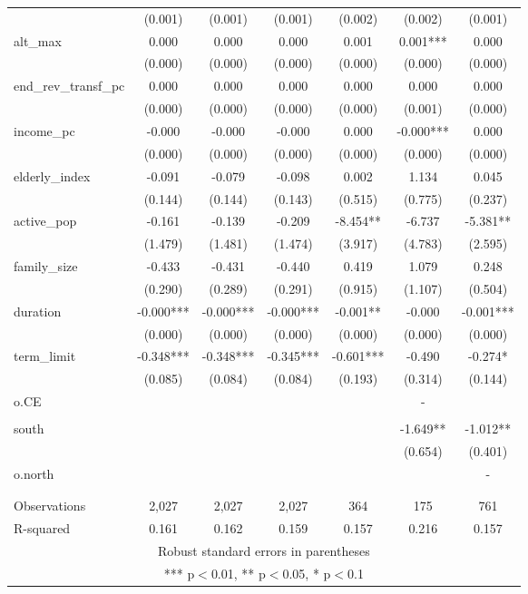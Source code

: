 \documentclass[]{article}
\begin{document}
\begin{tabular}{lcccccc}
 & (0.001) & (0.001) & (0.001) & (0.002) & (0.002) & (0.001) \\
alt\_max & 0.000 & 0.000 & 0.000 & 0.001 & 0.001*** & 0.000 \\
 & (0.000) & (0.000) & (0.000) & (0.000) & (0.000) & (0.000) \\
end\_rev\_transf\_pc & 0.000 & 0.000 & 0.000 & 0.000 & 0.000 & 0.000 \\
 & (0.000) & (0.000) & (0.000) & (0.000) & (0.001) & (0.000) \\
income\_pc & -0.000 & -0.000 & -0.000 & 0.000 & -0.000*** & 0.000 \\
 & (0.000) & (0.000) & (0.000) & (0.000) & (0.000) & (0.000) \\
elderly\_index & -0.091 & -0.079 & -0.098 & 0.002 & 1.134 & 0.045 \\
 & (0.144) & (0.144) & (0.143) & (0.515) & (0.775) & (0.237) \\
active\_pop & -0.161 & -0.139 & -0.209 & -8.454** & -6.737 & -5.381** \\
 & (1.479) & (1.481) & (1.474) & (3.917) & (4.783) & (2.595) \\
family\_size & -0.433 & -0.431 & -0.440 & 0.419 & 1.079 & 0.248 \\
 & (0.290) & (0.289) & (0.291) & (0.915) & (1.107) & (0.504) \\
duration & -0.000*** & -0.000*** & -0.000*** & -0.001** & -0.000 & -0.001*** \\
 & (0.000) & (0.000) & (0.000) & (0.000) & (0.000) & (0.000) \\
term\_limit & -0.348*** & -0.348*** & -0.345*** & -0.601*** & -0.490 & -0.274* \\
 & (0.085) & (0.084) & (0.084) & (0.193) & (0.314) & (0.144) \\
o.CE &  &  &  &  & - &  \\
 &  &  &  &  &  &  \\
south &  &  &  &  & -1.649** & -1.012** \\
 &  &  &  &  & (0.654) & (0.401) \\
o.north &  &  &  &  &  & - \\
 &  &  &  &  &  &  \\
 &  &  &  &  &  &  \\
Observations & 2,027 & 2,027 & 2,027 & 364 & 175 & 761 \\
 R-squared & 0.161 & 0.162 & 0.159 & 0.157 & 0.216 & 0.157 \\ \hline
\multicolumn{7}{c}{ Robust standard errors in parentheses} \\
\multicolumn{7}{c}{ *** p$<$0.01, ** p$<$0.05, * p$<$0.1} \\
\end{tabular}
\end{document}

